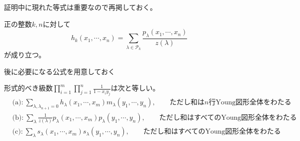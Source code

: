 \documentclass{ltjsreport}
\begin{document}
証明中に現れた等式は重要なので再掲しておく。

\begin{prop}\label{p_to_h}
  正の整数$k,n$に対して
  \[
    h_k(x_1,\cdots,x_n)=\sum_{\lambda\in\mathcal{P}_{k}}\frac{p_\lambda(x_1,\cdots,x_n)}{z(\lambda)}
  \]
  が成り立つ。
\end{prop}

後に必要になる公式を用意しておく


\begin{lemm}\label{formal_power_series_relation}
  形式的べき級数$\prod_{i=1}^m\prod_{j=1}^n\frac{1}{1-x_iy_j}$は次と等しい。
  \begin{align*}
    &\text{(a):}\:\sum_{\lambda,\lambda_{n+1}=0}h_\lambda(x_1,\cdots,x_m)m_\lambda(y_1,\cdots,y_n),\qquad \text{ただし和は$n$行Young図形全体をわたる}\\
    &\text{(b):}\:\sum_{\lambda}\frac{1}{z(\lambda)}p_\lambda(x_1,\cdots,x_m)p_\lambda(y_1,\cdots,y_n),\qquad \text{ただし和はすべてのYoung図形全体をわたる}\\
    &\text{(c):}\:\sum_{\lambda}s_\lambda(x_1,\cdots,x_m)s_\lambda(y_1,\cdots,y_n),\qquad \text{ただし和はすべてのYoung図形全体をわたる}
  \end{align*}
\end{lemm}
\end{document}

